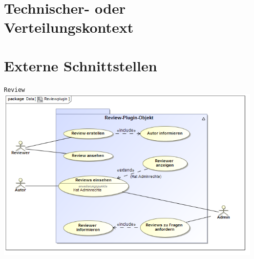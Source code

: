 \documentclass[a4paper]{scrreprt}
\begin{document}
\section{Technischer- oder Verteilungskontext}
\section{Externe Schnittstellen}
\texttt{Review}\\

\includegraphics[width=1.0\textwidth]{Use_Case_Diagram__Reviewplugin.png}
\label{Review}
\end{document}

